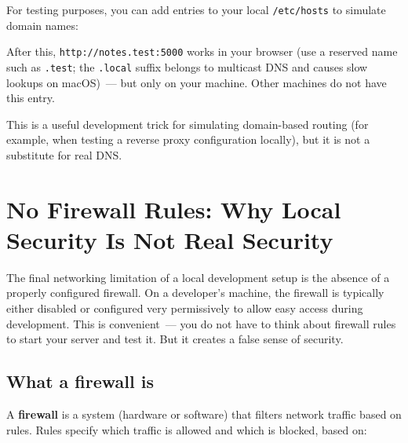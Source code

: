For testing purposes, you can add entries to your local \texttt{/etc/hosts} to simulate domain names:

\begin{codebox}[short]

\begin{Shaded}
\begin{Highlighting}[]
\end{Highlighting}
\end{Shaded}

\end{codebox}

\noindent{}After this, \texttt{http:/}\allowbreak{}\texttt{/}\allowbreak{}\texttt{notes.test:5000} works in your browser (use a reserved name such as \texttt{.test}; the \texttt{.local} suffix belongs to multicast DNS and causes slow lookups on macOS)~--- but only on your machine. Other machines do not have this entry.

This is a useful development trick for simulating domain-based routing (for example, when testing a reverse proxy configuration locally), but it is not a substitute for real DNS.

\setcounter{section}{3}
\section{No Firewall Rules: Why Local Security Is Not Real Security}\label{10-networking-limitations:104-no-firewall-rules-why-local-security-is-not-real-security}

The final networking limitation of a local development setup is the absence of a properly configured firewall. On a developer's machine, the firewall is typically either disabled or configured very permissively to allow easy access during development. This is convenient~--- you do not have to think about firewall rules to start your server and test it. But it creates a false sense of security.

\subsection*{What a firewall is}\label{10-networking-limitations:what-a-firewall-is}

A \textbf{firewall} is a system (hardware or software) that filters network traffic based on rules. Rules specify which traffic is allowed and which is blocked, based on:

